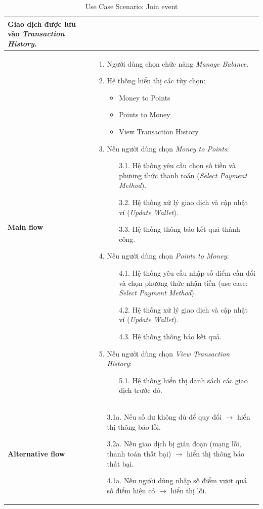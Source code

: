 \documentclass{article}
\begin{document}
\begin{table}[h!]
\begin{table}[h!]
\begin{tabular}{p{3cm} p{11cm}}
    Giao dịch được lưu vào \textit{Transaction History}. \\
\hline
\vspace{0.025cm}
\textbf{Main flow} & 
\begin{enumerate}
    \item Người dùng chọn chức năng \textit{Manage Balance}.
    \item Hệ thống hiển thị các tùy chọn:
    \begin{itemize}
        \item Money to Points
        \item Points to Money
        \item View Transaction History
    \end{itemize}
    \item Nếu người dùng chọn \textit{Money to Points}:
    \begin{itemize}
        \item[3.1.] Hệ thống yêu cầu chọn số tiền và phương thức thanh toán (\textit{Select Payment Method}).
        \item[3.2.] Hệ thống xử lý giao dịch và cập nhật ví (\textit{Update Wallet}).
        \item[3.3.] Hệ thống thông báo kết quả thành công.
    \end{itemize}
    \item Nếu người dùng chọn \textit{Points to Money}:
    \begin{itemize}
        \item[4.1.] Hệ thống yêu cầu nhập số điểm cần đổi và chọn phương thức nhận tiền (use case: \textit{Select Payment Method}).
        \item[4.2.] Hệ thống xử lý giao dịch và cập nhật ví (\textit{Update Wallet}).
        \item[4.3.] Hệ thống thông báo kết quả.
    \end{itemize}
    \item Nếu người dùng chọn \textit{View Transaction History}:
    \begin{itemize}
        \item[5.1.] Hệ thống hiển thị danh sách các giao dịch trước đó.
    \end{itemize}
\end{enumerate} \\
\hline
\vspace{0.025cm}
\textbf{Alternative flow} &
\begin{itemize}
    \item[3.1a.] Nếu số dư không đủ để quy đổi $\rightarrow$ hiển thị thông báo lỗi.
    \item[3.2a.] Nếu giao dịch bị gián đoạn (mạng lỗi, thanh toán thất bại) $\rightarrow$ hiển thị thông báo thất bại.
    \item[4.1a.] Nếu người dùng nhập số điểm vượt quá số điểm hiện có $\rightarrow$ hiển thị lỗi.
\end{itemize} \\
\hline
\end{tabular}
\caption{Use Case Scenario: Join event}
\end{table}

\end{table}
\end{document}
